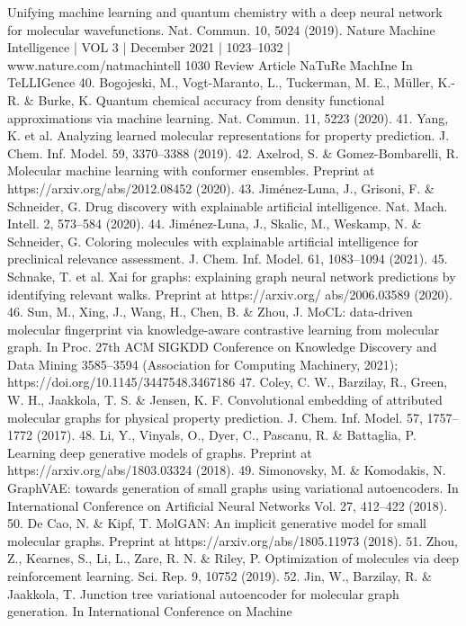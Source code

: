 Unifying machine learning and quantum chemistry with a deep neural
network for molecular wavefunctions. Nat. Commun. 10, 5024 (2019).
Nature Machine Intelligence | VOL 3 | December 2021 | 1023–1032 | www.nature.com/natmachintell
1030
Review Article
NaTuRe MachIne In TeLLIGence
	40.
Bogojeski, M., Vogt-Maranto, L., Tuckerman, M. E., Müller, K.-R. \& Burke,
K. Quantum chemical accuracy from density functional approximations via
machine learning. Nat. Commun. 11, 5223 (2020).
	41.
Yang, K. et al. Analyzing learned molecular representations for property
prediction. J. Chem. Inf. Model. 59, 3370–3388 (2019).
	42.
Axelrod, S. \& Gomez-Bombarelli, R. Molecular machine learning with
conformer ensembles. Preprint at https://arxiv.org/abs/2012.08452 (2020).
	43.
Jiménez-Luna, J., Grisoni, F. \& Schneider, G. Drug discovery with
explainable artificial intelligence. Nat. Mach. Intell. 2, 573–584 (2020).
	44.
Jiménez-Luna, J., Skalic, M., Weskamp, N. \& Schneider, G. Coloring
molecules with explainable artificial intelligence for preclinical relevance
assessment. J. Chem. Inf. Model. 61, 1083–1094 (2021).
	45.
Schnake, T. et al. Xai for graphs: explaining graph neural network
predictions by identifying relevant walks. Preprint at https://arxiv.org/
abs/2006.03589 (2020).
	46.
Sun, M., Xing, J., Wang, H., Chen, B. \& Zhou, J. MoCL: data-driven
molecular fingerprint via knowledge-aware contrastive learning from
molecular graph. In Proc. 27th ACM SIGKDD Conference on Knowledge
Discovery and Data Mining 3585–3594 (Association for Computing
Machinery, 2021); https://doi.org/10.1145/3447548.3467186
	47.
Coley, C. W., Barzilay, R., Green, W. H., Jaakkola, T. S. \& Jensen, K. F.
Convolutional embedding of attributed molecular graphs for physical
property prediction. J. Chem. Inf. Model. 57, 1757–1772 (2017).
	48.
Li, Y., Vinyals, O., Dyer, C., Pascanu, R. \& Battaglia, P. Learning deep
generative models of graphs. Preprint at https://arxiv.org/abs/1803.03324
(2018).
	49.
Simonovsky, M. \& Komodakis, N. GraphVAE: towards generation of small
graphs using variational autoencoders. In International Conference on
Artificial Neural Networks Vol. 27, 412–422 (2018).
	50.
De Cao, N. \& Kipf, T. MolGAN: An implicit generative model for small
molecular graphs. Preprint at https://arxiv.org/abs/1805.11973 (2018).
	51.
Zhou, Z., Kearnes, S., Li, L., Zare, R. N. \& Riley, P. Optimization of
molecules via deep reinforcement learning. Sci. Rep. 9, 10752 (2019).
	52.
Jin, W., Barzilay, R. \& Jaakkola, T. Junction tree variational autoencoder for
molecular graph generation. In International Conference on Machine
